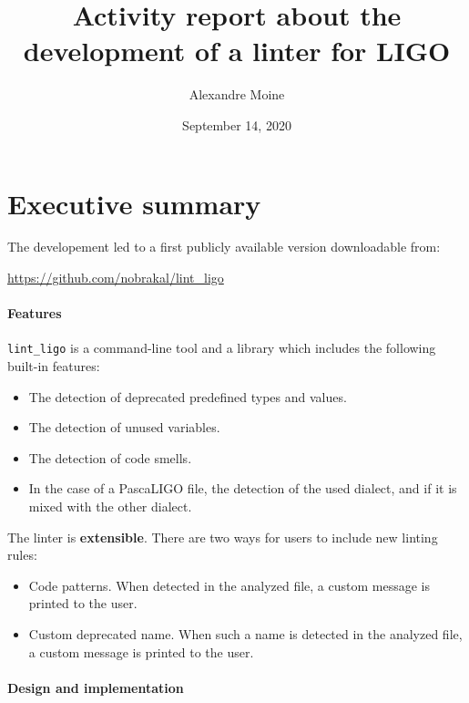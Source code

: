 \documentclass[10pt,a4paper]{article}
\author{Alexandre Moine}
\title{Activity report about the development of a linter for LIGO}
\date{September 14, 2020}
\begin{document}
\maketitle
{}

\section{Executive summary}

The developement led to a first publicly available version downloadable from:
\begin{center}
  \url{https://github.com/nobrakal/lint\_ligo}
\end{center}

\paragraph{Features}

\verb|lint_ligo| is a command-line tool and a library which includes the following built-in features:

\begin{itemize}
\item The detection of deprecated predefined types and values.
\item The detection of unused variables.
\item The detection of code smells.
\item In the case of a PascaLIGO file, the detection of the used dialect, and if it is mixed with the other dialect.
\end{itemize}

The linter is \textbf{extensible}. There are two ways for users to include new linting rules:

\begin{itemize}
\item Code patterns. When detected in the analyzed file, a custom message is printed to the user.
\item Custom deprecated name. When such a name is detected in the analyzed file, a custom message is printed to the user.
\end{itemize}

\paragraph{Design and implementation}
\end{document}

